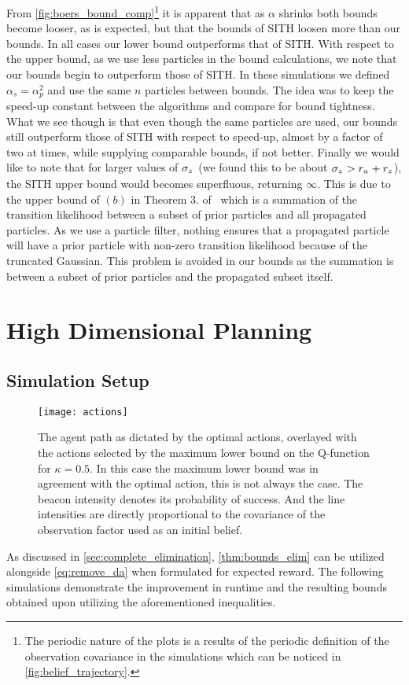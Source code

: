 	From \cref{fig:boers_bound_comp}\footnote{The periodic nature of the plots is a results of the periodic definition of the observation covariance in the simulations which can be noticed in \cref{fig:belief_trajectory}.} it is apparent that as $\alpha$ shrinks both bounds become looser, as is expected, but that the bounds of SITH loosen more than our bounds. In all cases our lower bound outperforms that of SITH. With respect to the upper bound, as we use less particles in the bound calculations, we note that our bounds begin to outperform those of SITH. In these simulations we defined $\alpha_s=\alpha_p^2$ and use the same $n$ particles between bounds. The idea was to keep the speed-up constant between the algorithms and compare for bound tightness. What we see though is that even though the same particles are used, our bounds still outperform those of SITH with respect to speed-up, almost by a factor of two at times, while supplying comparable bounds, if not better. Finally we would like to note that for larger values of $\sigma_{z_{}^{}}$ (we found this to be about $\sigma_{z_{}^{}}>r_{{a_{}}}+r_{z_{}^{}}$), the SITH upper bound would becomes superfluous, returning $\infty$. This is due to the upper bound of $(b)$ in Theorem 3. of~\cite{Sztyglic22iros} which is a summation of the transition likelihood between a subset of prior particles and all propagated particles. As we use a particle filter, nothing ensures that a propagated particle will have a prior particle with non-zero transition likelihood because of the truncated Gaussian. This problem is avoided in our bounds as the summation is between a subset of prior particles and the propagated subset itself.
\section{High Dimensional Planning}
\subsection{Simulation Setup}
\begin{figure}[h]
	\centering
	\texttt{[image: actions]}
	\caption{The agent path as dictated by the optimal actions, overlayed with the actions selected by the maximum lower bound on the Q-function for $\kappa=0.5$. In this case the maximum lower bound was in agreement with the optimal action, this is not always the case. The beacon intensity denotes its probability of success. And the line intensities are directly proportional to the covariance of the observation factor used as an initial belief.}
	\label{fig:actions}
\end{figure}
As discussed in \cref{sec:complete_elimination}, \autoref{thm:bounds_elim} can be utilized alongside \eqref{eq:remove_da} when formulated for expected reward. The following simulations demonstrate the improvement in runtime and the resulting bounds obtained upon utilizing the aforementioned inequalities.

